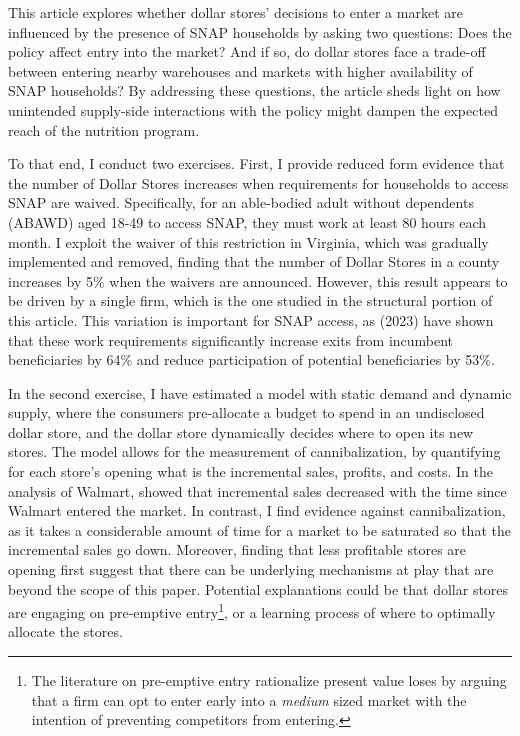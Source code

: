 \documentclass[11.5pt]{article}
\begin{document}
This article explores whether dollar stores' decisions to enter a market are influenced by the presence of SNAP households by asking two questions: Does the policy affect entry into the market? And if so, do dollar stores face a trade-off between entering nearby warehouses and markets with higher availability of SNAP households? By addressing these questions, the article sheds light on how unintended supply-side interactions with the policy might dampen the expected reach of the nutrition program.



To that end, I conduct two exercises. First, I provide reduced form evidence that the number of Dollar Stores increases when requirements for households to access SNAP are waived. Specifically, for an able-bodied adult without dependents (ABAWD) aged 18-49 to access SNAP, they must work at least 80 hours each month. I exploit the waiver of this restriction in Virginia, which was gradually implemented and removed, finding that the number of Dollar Stores in a county increases by 5\% when the waivers are announced. However, this result appears to be driven by a single firm, which is the one studied in the structural portion of this article. This variation is important for SNAP access, as \citeauthor{gray2023employed} (2023) have shown that these work requirements significantly increase exits from incumbent beneficiaries by 64\% and reduce participation of potential beneficiaries by 53\%.


In the second exercise, I have estimated a model with static demand and dynamic supply, where the consumers pre-allocate a budget to spend in an undisclosed dollar store, and the dollar store dynamically decides where to open its new stores. The model allows for the measurement of cannibalization, by quantifying for each store's opening what is the incremental sales, profits, and costs. In the analysis of Walmart, \citeauthor{holmes2011diffusion} showed that incremental sales decreased with the time since Walmart entered the market. In contrast, I find evidence against cannibalization, as it takes a considerable amount of time for a market to be saturated so that the incremental sales go down. Moreover, finding that less profitable stores are opening first suggest that there can be  underlying mechanisms at play that are beyond the scope of this paper. Potential explanations could be that dollar stores are engaging on pre-emptive entry\footnote{The literature on pre-emptive entry \cite{ellison2011strategic,gil2021preemptive} rationalize present value loses by arguing that a firm can opt to enter early into a \textit{medium} sized market with the intention of preventing competitors from entering.}, or a learning process of where to optimally allocate the stores. 
\end{document}

